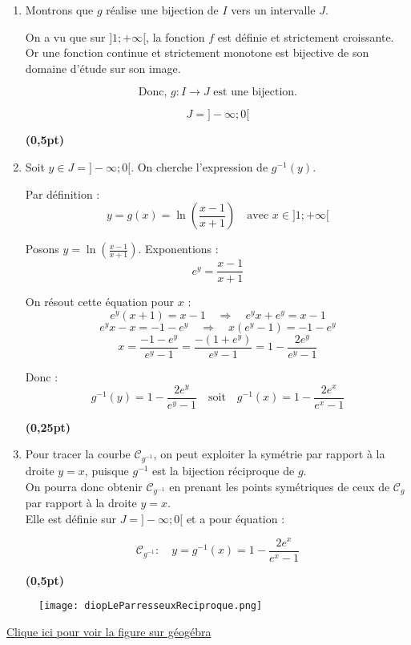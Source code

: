 \documentclass[12pt,a4paper]{article}
\begin{document}
\begin{enumerate}
    \item Montrons que \( g \) réalise une bijection de \( I \) vers un intervalle \( J \).

    On a vu que sur \( ]1 ; +\infty[ \), la fonction \( f \) est définie et strictement croissante.\\
    Or une fonction continue et strictement monotone est bijective de son domaine d’étude sur son image.

    \[
    \text{Donc, } g : I \to J \text{ est une bijection.}
    \]

    \[
    J = ]-\infty ; 0[
    \]

    \hfill \textbf{(0,5pt)}

    \item Soit \( y \in J = ]-\infty ; 0[ \). On cherche l'expression de \( g^{-1}(y) \).

    Par définition :
    \[
    y = g(x) = \ln\left( \frac{x - 1}{x + 1} \right) \quad \text{avec } x \in ]1 ; +\infty[
    \]

    Posons \( y = \ln\left( \frac{x - 1}{x + 1} \right) \). Exponentions :
    \[
    e^y = \frac{x - 1}{x + 1}
    \]

    On résout cette équation pour \( x \) :
    \[
    e^y(x + 1) = x - 1 \quad \Rightarrow \quad e^y x + e^y = x - 1
    \]
    \[
    e^y x - x = -1 - e^y \quad \Rightarrow \quad x(e^y - 1) = -1 - e^y
    \]
    \[
    x = \frac{-1 - e^y}{e^y - 1} = \frac{-(1 + e^y)}{e^y - 1} = 1 - \frac{2e^y}{e^y - 1}
    \]

    Donc :
    \[
    g^{-1}(y) = 1 - \frac{2e^y}{e^y - 1}
    \quad \text{soit} \quad
    g^{-1}(x) = 1 - \frac{2e^x}{e^x - 1}
    \]

    \hfill \textbf{(0,25pt)}

    \item Pour tracer la courbe \( \mathcal{C}_{g^{-1}} \), on peut exploiter la symétrie par rapport à la droite \( y = x \), puisque \( g^{-1} \) est la bijection réciproque de \( g \).\\

    On pourra donc obtenir \( \mathcal{C}_{g^{-1}} \) en prenant les points symétriques de ceux de \( \mathcal{C}_g \) par rapport à la droite \( y = x \).\\

    Elle est définie sur \( J = ]-\infty ; 0[ \) et a pour équation :

    \[
    \mathcal{C}_{g^{-1}} : \quad y = g^{-1}(x) = 1 - \frac{2e^x}{e^x - 1}
    \]

    \hfill \textbf{(0,5pt)}
\end{enumerate}

\begin{center}
        \begin{figure}[H]%
         \centering
         \texttt{[image: diopLeParresseuxReciproque.png]}
        \end{figure}
    \end{center}
        \href{https://www.geogebra.org/classic/efgm6ucx}{Clique ici pour voir la figure sur géogébra}
\end{document}
